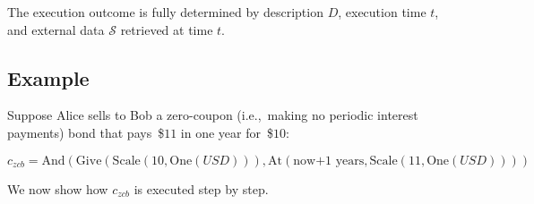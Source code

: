 The execution outcome is fully determined by description $D$, execution time $t$, and external data $\mathcal{S}$ retrieved at time $t$.


\subsection{Example}

Suppose Alice sells to Bob a zero-coupon (i.e.,~making no periodic interest payments) bond that pays~\$$11$ in one year for~\$$10$:

\[c_{zcb} = \mathrm{And}(\mathrm{Give}(\mathrm{Scale}(10,\mathrm{One}(USD))),\mathrm{At}(\text{now+1 years},\mathrm{Scale}(11,\mathrm{One}(USD))))\]

\pagebreak

We now show how \(c_{zcb}\) is executed step by step.

